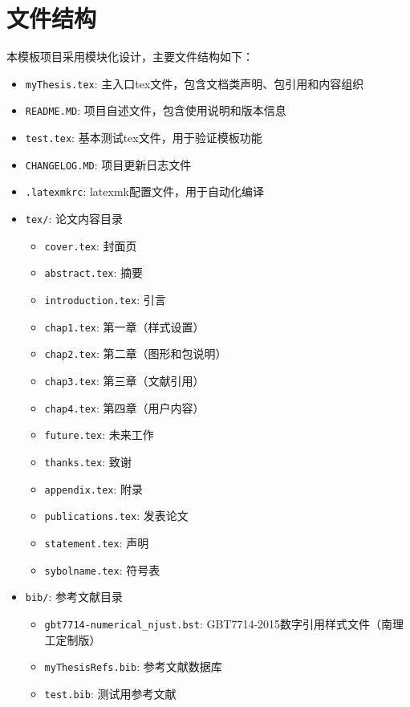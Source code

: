 \section{文件结构}

本模板项目采用模块化设计，主要文件结构如下：

\begin{itemize}

\item \texttt{myThesis.tex}: 主入口tex文件，包含文档类声明、包引用和内容组织
\item \texttt{README.MD}: 项目自述文件，包含使用说明和版本信息
\item \texttt{test.tex}: 基本测试tex文件，用于验证模板功能
\item \texttt{CHANGELOG.MD}: 项目更新日志文件
\item \texttt{.latexmkrc}: latexmk配置文件，用于自动化编译

\item \texttt{tex/}: 论文内容目录
    \begin{itemize}
        \item \texttt{cover.tex}: 封面页
        \item \texttt{abstract.tex}: 摘要
        \item \texttt{introduction.tex}: 引言
        \item \texttt{chap1.tex}: 第一章（样式设置）
        \item \texttt{chap2.tex}: 第二章（图形和包说明）
        \item \texttt{chap3.tex}: 第三章（文献引用）
        \item \texttt{chap4.tex}: 第四章（用户内容）
        \item \texttt{future.tex}: 未来工作
        \item \texttt{thanks.tex}: 致谢
        \item \texttt{appendix.tex}: 附录
        \item \texttt{publications.tex}: 发表论文
        \item \texttt{statement.tex}: 声明
        \item \texttt{sybolname.tex}: 符号表
    \end{itemize}

\item \texttt{bib/}: 参考文献目录
    \begin{itemize}
        \item \texttt{gbt7714-numerical\_njust.bst}: GBT7714-2015数字引用样式文件（南理工定制版）
        \item \texttt{myThesisRefs.bib}: 参考文献数据库
        \item \texttt{test.bib}: 测试用参考文献
    \end{itemize}


\end{itemize}

